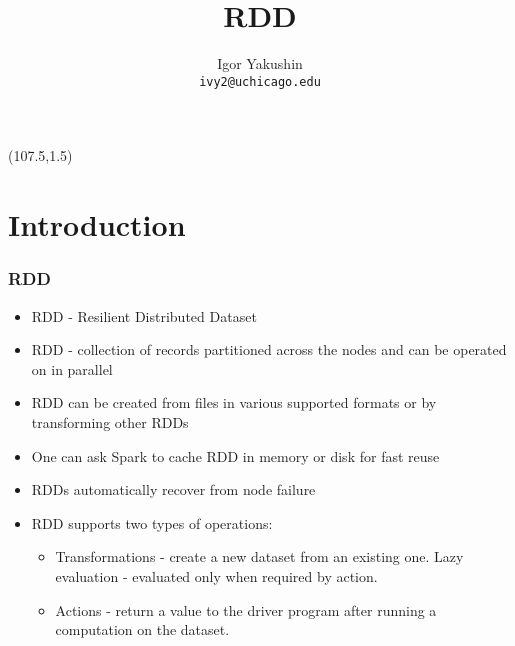 \documentclass{beamer}
\title{\huge{RDD}}
\author{Igor Yakushin \\ \texttt{ivy2@uchicago.edu}}
\newcommand{\SPARK}{
\begin{textblock}{14}(107.5,1.5)
  \pgfuseimage{spark}
\end{textblock}
}
\begin{document}



\begin{frame}
\SPARK
\titlepage
\end{frame}

\section{Introduction}
\begin{frame}[fragile]
  \frametitle{RDD}
  
  \begin{itemize}
  \item RDD - Resilient Distributed Dataset
  \item RDD - collection of records partitioned across the nodes and can be operated on in parallel
  \item RDD can be created from files in various supported formats or by transforming other RDDs
  \item One can ask Spark to {\color{mycolordef}cache RDD in memory or disk} for fast reuse
  \item RDDs automatically recover from node failure
  \item RDD supports two types of operations:
    \begin{itemize}
    \item {\color{mycolordef}Transformations} - create a new dataset from an existing one.
      Lazy evaluation - evaluated only when required by action.
    \item {\color{mycolordef}Actions} - return a value to the driver program after running a computation on the dataset.
    \end{itemize}
  \end{itemize}  

\end{frame}
\end{document}
